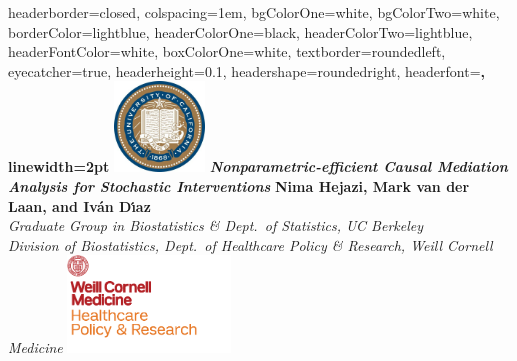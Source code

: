 \documentclass[landscape,a0paper,fontscale=0.285]{baposter} %
\begin{document}
\begin{poster} {
headerborder=closed, %
colspacing=1em, %
bgColorOne=white, %
bgColorTwo=white, %
borderColor=lightblue, %
headerColorOne=black, %
headerColorTwo=lightblue, %
headerFontColor=white, %
boxColorOne=white, %
textborder=roundedleft, %
eyecatcher=true, %
headerheight=0.1\textheight, %
headershape=roundedright, %
headerfont=\Large\bf\textsc, %
linewidth=2pt %
}
%
{\includegraphics[height=6.5em]{logo_berkeley.jpg}} %
{\bf\textit{\LARGE Nonparametric-efficient Causal Mediation Analysis for
    Stochastic Interventions}\vspace{0.01em}} %
{\textbf{Nima Hejazi, Mark van der Laan, and Iv{\'a}n D{\'\i}az} \\
  \textit{Graduate Group in Biostatistics \& Dept.~of Statistics, UC Berkeley}\\
  \textit{Division of Biostatistics, Dept.~of Healthcare Policy \& Research,
          Weill Cornell Medicine}}
{\includegraphics[height=7.0em]{logo_weill.png}} %


\end{poster}
\end{document}
